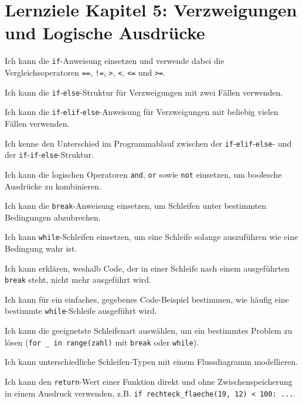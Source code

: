 \section*{Lernziele Kapitel 5: Verzweigungen und Logische Ausdrücke}
\begin{todolist}
    \item Ich kann die \lstinline|if|-Anweisung einsetzen und verwende dabei die Vergleichsoperatoren \lstinline|==|, \lstinline|!=|, \lstinline|>|, \lstinline|<|, \lstinline|<=| und \lstinline|>=|.
    \item Ich kann die \lstinline|if|-\lstinline|else|-Struktur für Verzweigungen mit zwei Fällen verwenden.
    \item Ich kann die \lstinline|if|-\lstinline|elif|-\lstinline|else|-Anweisung für Verzweigungen mit beliebig vielen Fällen verwenden.
    \item Ich kenne den Unterschied im Programmablauf zwischen der \lstinline|if|-\lstinline|elif|-\lstinline|else|- und der \lstinline|if|-\lstinline|if|-\lstinline|else|-Struktur.
    \item Ich kann die logischen Operatoren \lstinline|and|, \lstinline|or| sowie \lstinline|not| einsetzen, um boolesche Ausdrücke zu kombinieren.
    \item Ich kann die \lstinline|break|-Anweisung einsetzen, um Schleifen unter bestimmten Bedingungen abzubrechen.
    \item Ich kann \lstinline|while|-Schleifen einsetzen, um eine Schleife solange auszuführen wie eine Bedingung wahr ist.
    \item Ich kann erklären, weshalb Code, der in einer Schleife nach einem ausgeführten \lstinline|break| steht, nicht mehr ausgeführt wird.
    \item Ich kann für ein einfaches, gegebenes Code-Beispiel bestimmen, wie häufig eine bestimmte \lstinline|while|-Schleife ausgeführt wird.
    \item Ich kann die geeignetste Schleifenart auswählen, um ein bestimmtes Problem zu lösen (\lstinline|for _ in range(zahl)| mit \lstinline|break| oder \lstinline|while|).
    \item Ich kann unterschiedliche Schleifen-Typen mit einem Flussdiagramm modellieren.
    \item Ich kann den \lstinline|return|-Wert einer Funktion direkt und ohne Zwischenspeicherung in einem Ausdruck verwenden, z.B. \lstinline|if rechteck_flaeche(19, 12) < 100: ...|.
\end{todolist}

